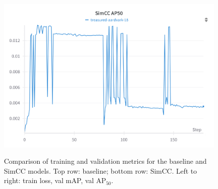 \begin{figure}[htp]
\begin{minipage}[b]{0.32\linewidth}
    \centering
    \includegraphics[width=\linewidth]{figures/AP50_SimCC.png}
    \label{fig:ap50_simcc}
  \end{minipage}

  \caption{Comparison of training and validation metrics for the baseline and SimCC models. Top row: baseline; bottom row: SimCC. Left to right: train loss, val mAP, val AP$_{50}$.}
  \label{fig:all_metrics_grid}
\end{figure}